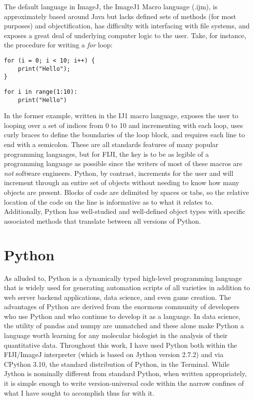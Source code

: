 The default language in ImageJ, the ImageJ1 Macro language (.ijm), is approximately based around Java but lacks defined sets of methods (for most purposes) and objectification, has difficulty with interfacing with file systems, and exposes a great deal of underlying computer logic to the user. Take, for instance, the procedure for writing a \textit{for} loop:

\begin{code}
\begin{verbatim}
for (i = 0; i < 10; i++) {
    print("Hello");
}
\end{verbatim}
\end{code}

\begin{code}
\begin{verbatim}
for i in range(1:10):
    print("Hello")
\end{verbatim}
\end{code}

In the former example, written in the IJ1 macro language, exposes the user to looping over a set of indices from 0 to 10 and incrementing with each loop, uses curly braces to define the boundaries of the loop block, and requires each line to end with a semicolon. These are all standards features of many popular programming languages, but for FIJI, the key is to be as legible of a programming language as possible since the writers of most of these macros are \textit{not} software engineers. Python, by contrast, increments for the user and will increment through an entire set of objects without needing to know how many objects are present. Blocks of code are delimited by spaces or tabs, so the relative location of the code on the line is informative as to what it relates to. Additionally, Python has well-studied and well-defined object types with specific associated methods that translate between all versions of Python. 
 
\section{Python}\label{python}

As alluded to, Python is a dynamically typed high-level programming language that is widely used for generating automation scripts of all varieties in addition to web server backend applications, data science, and even game creation. The advantages of Python are derived from the enormous community of developers who use Python and who continue to develop it as a language. In data science, the utility of pandas and numpy are unmatched and these alone make Python a language worth learning for any molecular biologist in the analysis of their quantitative data. Throughout this work, I have used Python both within the FIJI/ImageJ interpreter (which is based on Jython version 2.7.2) and via CPython 3.10, the standard distribution of Python, in the Terminal. While Jython is nominally different from standard Python, when written appropriately, it is simple enough to write version-universal code within the narrow confines of what I have sought to accomplish thus far with it.


